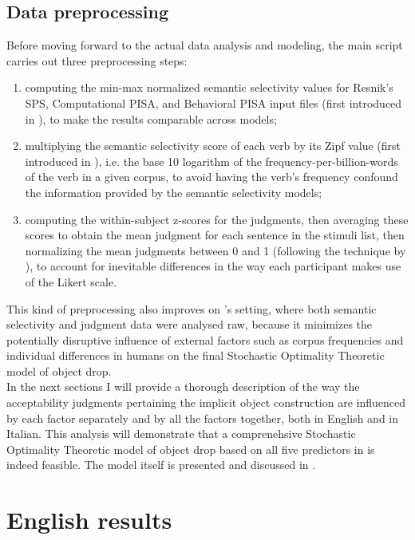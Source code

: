 \subsection{Data preprocessing} 

Before moving forward to the actual data analysis and modeling, the main script carries out three preprocessing steps:
\begin{enumerate}
    \item computing the min-max normalized semantic selectivity values for Resnik's SPS, Computational PISA, and Behavioral PISA input files (first introduced in ), to make the results comparable across models;
    \item multiplying the semantic selectivity score of each verb by its Zipf value (first introduced in ), i.e. the base 10 logarithm of the frequency-per-billion-words of the verb in a given corpus, to avoid having the verb's frequency confound the information provided by the semantic selectivity models;
    \item computing the within-subject z-scores for the judgments, then averaging these scores to obtain the mean judgment for each sentence in the stimuli list, then normalizing the mean judgments between 0 and 1 (following the technique by \textcite{KimEtAl2018, KimEtAl2019, KimEtAl2019a}), to account for inevitable differences in the way each participant makes use of the Likert scale.
\end{enumerate}

This kind of preprocessing also improves on \textcite{Medina2007}'s setting, where both semantic selectivity and judgment data were analysed raw, because it minimizes the potentially disruptive influence of external factors such as corpus frequencies and individual differences in humans on the final Stochastic Optimality Theoretic model of object drop.\\
In the next sections I will provide a thorough description of the way the acceptability judgments pertaining the implicit object construction are influenced by each factor separately and by all the factors together, both in English and in Italian. This analysis will demonstrate that a comprenehsive Stochastic Optimality Theoretic model of object drop based on all five predictors in  is indeed feasible. The model itself is presented and discussed in .


\section{English results} 

